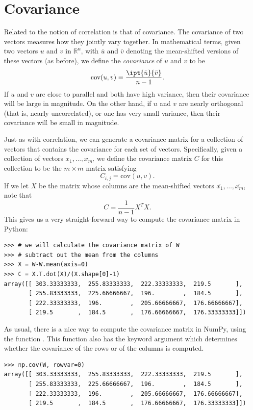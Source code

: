 \section*{Covariance}
Related to the notion of correlation is that of covariance. 
The covariance of two vectors measures how they jointly vary together. 
In mathematical terms, given two vectors $u$ and $v$ in $\mathbb{R}^n$, with $\bar{u}$ and $\bar{v}$ denoting the mean-shifted 
versions of these vectors (as before), we define the \emph{covariance} of $u$ and $v$ to be
\[
\text{cov}(u,v) = \frac{\ipt{\bar{u}}{\bar{v}}}{n-1}.
\]
If $u$ and $v$ are close to parallel and both have high variance, then their covariance will be large in magnitude. 
On the other hand, if $u$ and $v$ are nearly orthogonal (that is, nearly uncorrelated), or one has very small variance,
then their covariance will be small in magnitude. 

Just as with correlation, we can generate a covariance matrix for a collection of vectors that contains the covariance for each set of vectors.
Specifically, given a collection of vectors $x_1,\ldots, x_m$, we define the covariance matrix $C$ for this collection to be the $m \times m$ matrix satisfying
\[
C_{i,j} = \text{cov}(u,v).
\]
If we let $X$ be the matrix whose columns are the mean-shifted vectors $\bar{x_1}, \ldots, \bar{x_m}$, note that
\begin{equation}
C = \frac{1}{n-1}X^TX.
\label{eq:cov}
\end{equation}
This gives us a very straight-forward way to compute the covariance matrix in Python:
\begin{lstlisting}
>>> # we will calculate the covariance matrix of W
>>> # subtract out the mean from the columns
>>> X = W-W.mean(axis=0)
>>> C = X.T.dot(X)/(X.shape[0]-1)
array([[ 303.33333333,  255.83333333,  222.33333333,  219.5       ],
       [ 255.83333333,  225.66666667,  196.        ,  184.5       ],
       [ 222.33333333,  196.        ,  205.66666667,  176.66666667],
       [ 219.5       ,  184.5       ,  176.66666667,  176.33333333]])
\end{lstlisting}
As usual, there is a nice way to compute the covariance matrix in NumPy, using the function . This function
also has the keyword argument  which determines whether the covariance of the rows or of the columns is computed.
\begin{lstlisting}
>>> np.cov(W, rowvar=0)
array([[ 303.33333333,  255.83333333,  222.33333333,  219.5       ],
       [ 255.83333333,  225.66666667,  196.        ,  184.5       ],
       [ 222.33333333,  196.        ,  205.66666667,  176.66666667],
       [ 219.5       ,  184.5       ,  176.66666667,  176.33333333]])
\end{lstlisting}


